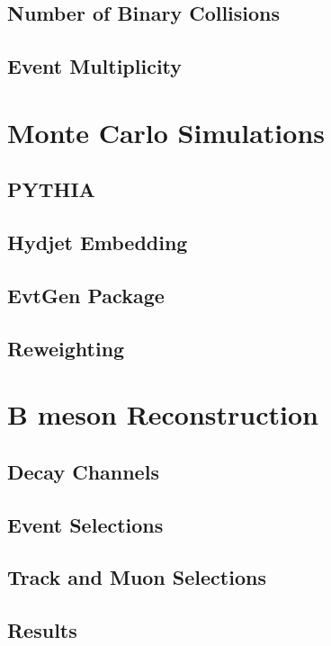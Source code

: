 \subsection{Number of Binary Collisions}

\subsection{Event Multiplicity}

\section{Monte Carlo Simulations} 

\subsection{PYTHIA}

\subsection{Hydjet Embedding}

\subsection{EvtGen Package}

\subsection{Reweighting}

\section{B meson Reconstruction} 

\subsection{Decay Channels}

\subsection{Event Selections}

\subsection{Track and Muon Selections}

\subsection{Results}

